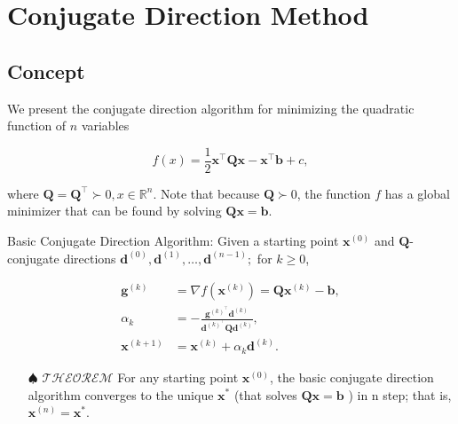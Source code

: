 \section{Conjugate Direction Method}

\subsection{Concept}
We present the conjugate direction algorithm for minimizing the quadratic function of \(n\) variables

\[
	f(x)=\frac{1}{2} \boldsymbol{x}^{\top} \boldsymbol{Q} \boldsymbol{x}-\boldsymbol{x}^{\top} \boldsymbol{b} + c,
\]

where \(\boldsymbol{Q}=\boldsymbol{Q}^{\top} \succ 0, x \in \mathbb{R}^{n}\). Note that because \(\boldsymbol{Q} \succ 0\), the function \(f\) has a global minimizer that can be found by solving \(\boldsymbol{Q} \boldsymbol{x}=\boldsymbol{b}\).

Basic Conjugate Direction Algorithm: Given a starting point \(\boldsymbol{x}^{(0)}\) and \(\boldsymbol{Q}\)-conjugate directions \(\boldsymbol{d}^{(0)}, \boldsymbol{d}^{(1)}, \ldots, \boldsymbol{d}^{(n-1)} ;\) for \(k \geq 0\),

\[
	\begin{aligned}
		\boldsymbol{g}^{(k)} & =\nabla f\left(\boldsymbol{x}^{(k)}\right)=\boldsymbol{Q} \boldsymbol{x}^{(k)}-\boldsymbol{b}, \\
		\alpha_{k} & =-\frac{\boldsymbol{g}^{(k)^{\top}} \boldsymbol{d}^{(k)}}{\boldsymbol{d}^{(k)^{\top}} \boldsymbol{Q} \boldsymbol{d}^{(k)}}, \\
		\boldsymbol{x}^{(k+1)} & =\boldsymbol{x}^{(k)}+\alpha_{k} \boldsymbol{d}^{(k)} .
	\end{aligned}
\]

\begin{itemize}
	\item[\(\spadesuit\)] \(\mathscr{THEOREM}\) For any starting point \(\boldsymbol{x}^{(0)}\), the basic conjugate direction algorithm converges to the unique \(\boldsymbol{x}^{*}\) (that solves \(\boldsymbol{Q} \boldsymbol{x}=\boldsymbol{b}\) ) in n step; that is, \(\boldsymbol{x}^{(n)}=\boldsymbol{x}^{*}\).
\end{itemize}
	
